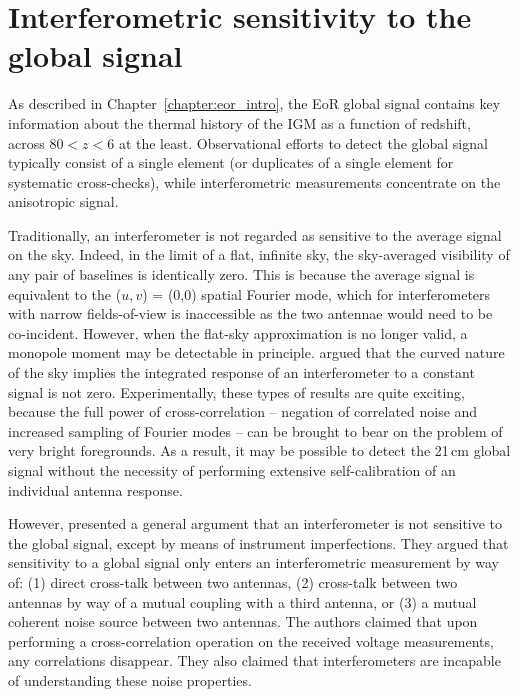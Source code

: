 \chapter{Interferometric sensitivity to the global signal}
\label{chapter:TAV}

As described in Chapter~\ref{chapter:eor_intro}, the EoR global signal contains key information about the thermal history of the IGM as a function of redshift, across $80<z<6$ at the least. Observational efforts to detect the global signal typically consist of a single element (or duplicates of a single element for systematic cross-checks), while interferometric measurements concentrate on the anisotropic signal. 

Traditionally, an interferometer is not regarded as sensitive to the average signal on the sky. Indeed, in the limit of a flat, infinite sky, the sky-averaged visibility of any pair of baselines is identically zero. This is because the average signal is equivalent to the ($u,v$) = (0,0) spatial Fourier mode, which for interferometers with narrow fields-of-view is inaccessible as the two antennae would need to be co-incident.
However, when the flat-sky approximation is no longer valid, a monopole moment may be detectable in principle. \cite{Presley.15} argued that the curved nature of the sky implies the integrated response of an interferometer to a constant signal is not zero. Experimentally, these types of results are quite exciting, because the full power of cross-correlation -- negation of correlated noise and increased sampling of Fourier modes -- can be brought to bear on the problem of very bright foregrounds. As a result, it may be possible to detect the 21\,cm global signal without the necessity of performing extensive self-calibration of an individual antenna response.

However, \cite{Venumadhav.16} presented a general argument that an interferometer is not sensitive to the global signal, except by means of instrument imperfections. They argued that sensitivity to a global signal only enters an interferometric measurement by way of: (1) direct cross-talk between two antennas, (2) cross-talk between two antennas by way of a mutual coupling with a third antenna, or (3) a mutual coherent noise source between two antennas. The authors claimed that upon performing a cross-correlation operation on the received voltage measurements, any correlations disappear. They also claimed that interferometers are incapable of understanding these noise properties.

